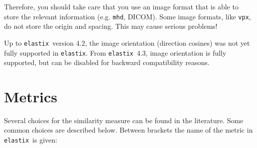 \documentclass[]{report}
\newcommand{\elastix}{\texttt{elastix}}
\begin{document}
Therefore, you should take care that you use an image format that
is able to store the relevant information (e.g. \texttt{mhd},
DICOM). Some image formats, like \texttt{vpx}, do not store the
origin and spacing. This may cause serious problems!

Up to \elastix\ version 4.2, the image orientation (direction cosines) was not
yet fully supported in \elastix. From \elastix\ 4.3, image orientation is fully
supported, but can be disabled for backward compatibility reasons.

\section{Metrics}\label{sec:comp:metric}

Several choices for the similarity measure can be found in the
literature. Some common choices are described below. Between brackets
the name of the metric in \elastix\ is given:
\end{document}
